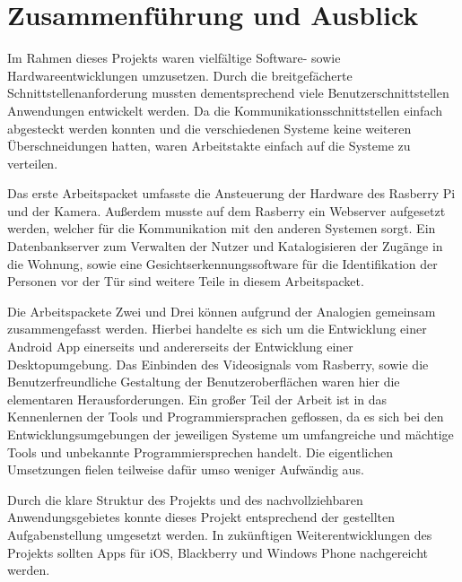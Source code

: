 
\chapter{Zusammenführung und Ausblick}
Im Rahmen dieses Projekts waren vielfältige Software- sowie Hardwareentwicklungen umzusetzen. Durch die breitgefächerte Schnittstellenanforderung mussten dementsprechend viele Benutzerschnittstellen Anwendungen entwickelt werden. Da die Kommunikationsschnittstellen einfach abgesteckt werden konnten und die verschiedenen Systeme keine weiteren Überschneidungen hatten, waren Arbeitstakte einfach auf die Systeme zu verteilen. 
\par
Das erste Arbeitspacket umfasste die Ansteuerung der Hardware des Rasberry Pi und der Kamera. Außerdem musste auf dem Rasberry ein Webserver aufgesetzt werden, welcher für die Kommunikation mit den anderen Systemen sorgt. Ein Datenbankserver zum Verwalten der Nutzer und Katalogisieren der Zugänge in die Wohnung, sowie eine Gesichtserkennungssoftware für die Identifikation der Personen vor der Tür sind weitere Teile in diesem Arbeitspacket.
\par
Die Arbeitspackete Zwei und Drei können aufgrund der Analogien gemeinsam zusammengefasst werden. Hierbei handelte es sich um die Entwicklung einer Android App einerseits und andererseits der Entwicklung einer Desktopumgebung. Das Einbinden des Videosignals vom Rasberry, sowie die Benutzerfreundliche Gestaltung der Benutzeroberflächen waren hier die elementaren Herausforderungen. Ein großer Teil der Arbeit ist in das Kennenlernen der Tools und Programmiersprachen geflossen, da es sich bei den Entwicklungsumgebungen der jeweiligen Systeme um umfangreiche und mächtige Tools und unbekannte Programmiersprechen handelt. Die eigentlichen Umsetzungen fielen teilweise dafür umso weniger Aufwändig aus. 
\par
Durch die klare Struktur des Projekts und des nachvollziehbaren Anwendungsgebietes konnte dieses Projekt entsprechend der gestellten Aufgabenstellung umgesetzt werden. In zukünftigen Weiterentwicklungen des Projekts sollten Apps für iOS, Blackberry und Windows Phone nachgereicht werden. 
